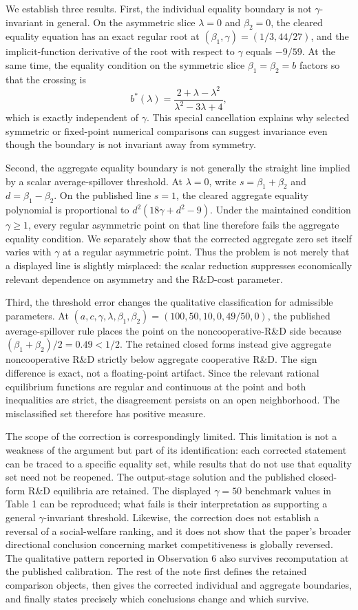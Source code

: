 We establish three results. First, the individual equality boundary is not $\gamma$-invariant in general. On the asymmetric slice $\lambda=0$ and $\beta_2=0$, the cleared equality equation has an exact regular root at $(\beta_1,\gamma)=(1/3,44/27)$, and the implicit-function derivative of the root with respect to $\gamma$ equals $-9/59$. At the same time, the equality condition on the symmetric slice $\beta_1=\beta_2=b$ factors so that the crossing is
\[
 b^*(\lambda)=\frac{2+\lambda-\lambda^2}{\lambda^2-3\lambda+4},
\]
which is exactly independent of $\gamma$. This special cancellation explains why selected symmetric or fixed-point numerical comparisons can suggest invariance even though the boundary is not invariant away from symmetry.

Second, the aggregate equality boundary is not generally the straight line implied by a scalar average-spillover threshold. At $\lambda=0$, write $s=\beta_1+\beta_2$ and $d=\beta_1-\beta_2$. On the published line $s=1$, the cleared aggregate equality polynomial is proportional to $d^2(18\gamma+d^2-9)$. Under the maintained condition $\gamma\geq1$, every regular asymmetric point on that line therefore fails the aggregate equality condition. We separately show that the corrected aggregate zero set itself varies with $\gamma$ at a regular asymmetric point. Thus the problem is not merely that a displayed line is slightly misplaced: the scalar reduction suppresses economically relevant dependence on asymmetry and the R\&D-cost parameter.

Third, the threshold error changes the qualitative classification for admissible parameters. At $(a,c,\gamma,\lambda,\beta_1,\beta_2)=(100,50,10,0,49/50,0)$, the published average-spillover rule places the point on the noncooperative-R\&D side because $(\beta_1+\beta_2)/2=0.49<1/2$. The retained closed forms instead give aggregate noncooperative R\&D strictly below aggregate cooperative R\&D. The sign difference is exact, not a floating-point artifact. Since the relevant rational equilibrium functions are regular and continuous at the point and both inequalities are strict, the disagreement persists on an open neighborhood. The misclassified set therefore has positive measure.

The scope of the correction is correspondingly limited. This limitation is not a weakness of the argument but part of its identification: each corrected statement can be traced to a specific equality set, while results that do not use that equality set need not be reopened. The output-stage solution and the published closed-form R\&D equilibria are retained. The displayed $\gamma=50$ benchmark values in Table 1 can be reproduced; what fails is their interpretation as supporting a general $\gamma$-invariant threshold. Likewise, the correction does not establish a reversal of a social-welfare ranking, and it does not show that the paper's broader directional conclusion concerning market competitiveness is globally reversed. The qualitative pattern reported in Observation 6 also survives recomputation at the published calibration. The rest of the note first defines the retained comparison objects, then gives the corrected individual and aggregate boundaries, and finally states precisely which conclusions change and which survive.
